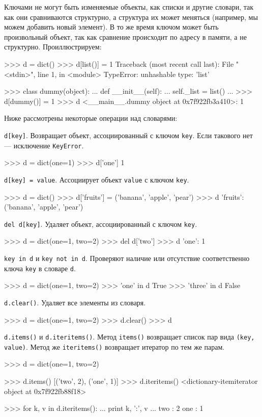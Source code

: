 Ключами не могут быть изменяемые объекты, как списки и другие словари, так как они сравниваются структурно, а структура их может меняться (например, мы можем добавить новый элемент). В то же время ключом может быть произвольный объект, так как сравнение происходит по адресу в памяти, а не структурно. Проиллюстрируем:
\begin{pylst}{}{}
>>> d = dict()
>>> d[list()] = 1
Traceback (most recent call last):
  File "<stdin>", line 1, in <module>
TypeError: unhashable type: 'list'

>>> class dummy(object):
...     def __init__(self):
...         self._list = list()
...
>>> d[dummy()] = 1
>>> d
{<__main__.dummy object at 0x7f922fb3a410>: 1}
\end{pylst}

Ниже рассмотрены некоторые операции над словарями:

\lstinline{d[key]}. Возвращает объект, ассоциированный с ключом \lstinline{key}. Если такового нет — исключение \lstinline{KeyError}.
\begin{pylst}{}{}
>>> d = dict(one=1)
>>> d['one']
1
\end{pylst}

\lstinline{d[key] = value}. Ассоциирует объект \lstinline{value} с ключом \lstinline{key}.
\begin{pylst}{}{}
>>> d = dict()
>>> d['fruits'] = ('banana', 'apple', 'pear')
>>> d
{'fruits': ('banana', 'apple', 'pear')}
\end{pylst}

\lstinline{del d[key]}. Удаляет объект, ассоциированный с ключом \lstinline{key}.
\begin{pylst}{}{}
>>> d = dict(one=1, two=2)
>>> del d['two']
>>> d
{'one': 1}
\end{pylst}

\lstinline{key in d} и \lstinline{key not in d}. Проверяют наличие или отсутствие соответственно ключа \lstinline{key} в словаре \lstinline{d}.
\begin{pylst}{}{}
>>> d = dict(one=1, two=2)
>>> 'one' in d
True
>>> 'three' in d
False
\end{pylst}

\lstinline{d.clear()}. Удаляет все элементы из словаря.
\begin{pylst}{}{}
>>> d = dict(one=1, two=2)
>>> d.clear()
>>> d
{}
\end{pylst}

\lstinline{d.items()} и \lstinline{d.iteritems()}. Метод \lstinline{items()} возвращает список пар вида \lstinline{(key, value)}. Метод же \lstinline{iteritems()} возвращает итератор по тем же парам.
\begin{pylst}{}{}
>>> d = dict(one=1, two=2)

>>> d.items()
[('two', 2), ('one', 1)]
>>> d.iteritems()
<dictionary-itemiterator object at 0x7f922fb88f18>

>>> for k, v in d.iteritems():
...     print k, ':', v
...
two : 2
one : 1
\end{pylst}

